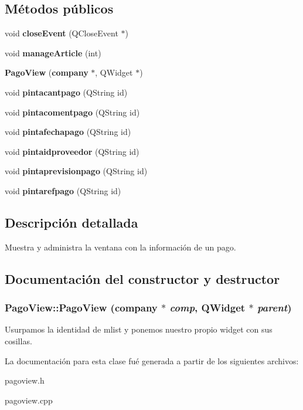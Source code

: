 \subsection*{M\'{e}todos p\'{u}blicos}
\begin{CompactItemize}
\item 
void {\bf close\-Event} (QClose\-Event $\ast$)\label{classPagoView_a0}

\item 
void {\bf manage\-Article} (int)\label{classPagoView_a1}

\item 
{\bf Pago\-View} ({\bf company} $\ast$, QWidget $\ast$)
\item 
void {\bf pintacantpago} (QString id)\label{classPagoView_a3}

\item 
void {\bf pintacomentpago} (QString id)\label{classPagoView_a4}

\item 
void {\bf pintafechapago} (QString id)\label{classPagoView_a5}

\item 
void {\bf pintaidproveedor} (QString id)\label{classPagoView_a6}

\item 
void {\bf pintaprevisionpago} (QString id)\label{classPagoView_a7}

\item 
void {\bf pintarefpago} (QString id)\label{classPagoView_a8}

\end{CompactItemize}


\subsection{Descripci\'{o}n detallada}
Muestra y administra la ventana con la informaci\'{o}n de un pago. 



\subsection{Documentaci\'{o}n del constructor y destructor}
\subsubsection{\setlength{\rightskip}{0pt plus 5cm}Pago\-View::Pago\-View ({\bf company} $\ast$ {\em comp}, QWidget $\ast$ {\em parent})}\label{classPagoView_a2}


Usurpamos la identidad de mlist y ponemos nuestro propio widget con sus cosillas. 

La documentaci\'{o}n para esta clase fu\'{e} generada a partir de los siguientes archivos:\begin{CompactItemize}
\item 
pagoview.h\item 
pagoview.cpp\end{CompactItemize}
